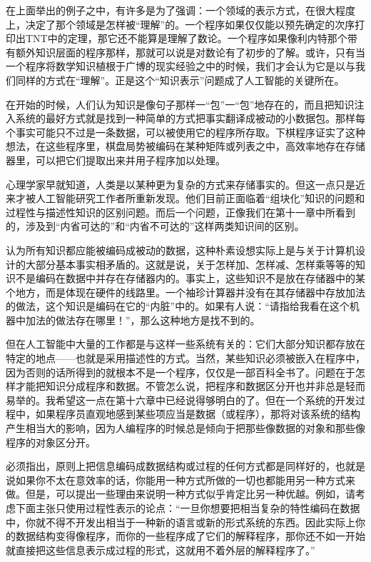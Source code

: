 在上面举出的例子之中，有许多是为了强调：一个领域的表示方式，在很大程度上，决定了那个领域是怎样被“理解”的。一个程序如果仅仅能以预先确定的次序打印出TNT中的定理，那它还不能算是理解了数论。一个程序如果像利内特那个带有额外知识层面的程序那样，那就可以说是对数论有了初步的了解。或许，只有当一个程序将数学知识植根于广博的现实经验之中的时候，我们才会认为它是以与我们同样的方式在“理解”。正是这个“知识表示”问题成了人工智能的关键所在。

在开始的时候，人们认为知识是像句子那样一“包”一“包”地存在的，而且把知识注入系统的最好方式就是找到一种简单的方式把事实翻译成被动的小数据包。那样每个事实可能只不过是一条数据，可以被使用它的程序所存取。下棋程序证实了这种想法，在这些程序里，棋盘局势被编码在某种矩阵或列表之中，高效率地存在存储器里，可以把它们提取出来并用子程序加以处理。

心理学家早就知道，人类是以某种更为复杂的方式来存储事实的。但这一点只是近来才被人工智能研究工作者所重新发现。他们目前正面临着“组块化”知识的问题和过程性与描述性知识的区别问题。而后一个问题，正像我们在第十一章中所看到的，涉及到“内省可达的”和“内省不可达的”这样两类知识间的区别。

认为所有知识都应能被编码成被动的数据，这种朴素设想实际上是与关于计算机设计的大部分基本事实相矛盾的。这就是说，关于怎样加、怎样减、怎样乘等等的知识不是编码在数据中并存在存储器内的。事实上，这些知识不是放在存储器中的某个地方，而是体现在硬件的线路里。一个袖珍计算器并没有在其存储器中存放加法的做法，这个知识是编码在它的“内脏”中的。如果有人说：“请指给我看在这个机器中加法的做法存在哪里！”，那么这种地方是找不到的。

但在人工智能中大量的工作都是与这样一些系统有关的：它们大部分知识都存放在特定的地点——也就是采用描述性的方式。当然，某些知识必须被嵌入在程序中，因为否则的话所得到的就根本不是一个程序，仅仅是一部百科全书了。问题在于怎样才能把知识分成程序和数据。不管怎么说，把程序和数据区分开也并非总是轻而易举的。我希望这一点在第十六章中已经说得够明白的了。但在一个系统的开发过程中，如果程序员直观地感到某些项应当是数据（或程序），那将对该系统的结构产生相当大的影响，因为人编程序的时候总是倾向于把那些像数据的对象和那些像程序的对象区分开。

必须指出，原则上把信息编码成数据结构或过程的任何方式都是同样好的，也就是说如果你不太在意效率的话，你能用一种方式所做的一切也都能用另一种方式来做。但是，可以提出一些理由来说明一种方式似乎肯定比另一种优越。例如，请考虑下面主张只使用过程性表示的论点：“一旦你想要把相当复杂的特性编码在数据中，你就不得不开发出相当于一种新的语言或新的形式系统的东西。因此实际上你的数据结构变得像程序，而你的一些程序成了它们的解释程序，那你还不如一开始就直接把这些信息表示成过程的形式，这就用不着外层的解释程序了。”

